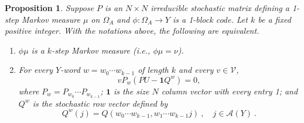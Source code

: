 \documentclass{kepart2010}
\theoremstyle{plain}
\newtheorem{prop}[thm]{Proposition}
\theoremstyle{definition}
\theoremstyle{remark}
\theoremstyle{definition}
\numberwithin{equation}{section}
\begin{document}
{}{
\begin{prop} \label{kmarkov} \cite{GurvitsLedoux2005}
Suppose $P$ is an $N\times N$ irreducible stochastic matrix defining
a 1-step Markov measure $\mu$
on $\Omega_A$ and $\phi: \Omega_A \to Y $ is
a 1-block code. Let $k$ be a fixed positive integer.
With the notations above, the following are equivalent.
\begin{enumerate}
\item
$\phi \mu $ is a $k$-step Markov measure
(i.e., $\phi \mu = \nu$).
\item For every $Y$-word $w=w_0\cdots w_{k-1}$
of length $k$ and
every $v\in \mathcal V$,
 \begin{equation} \label{firstkmarkovcondition}
vP_w(PU-\mathbf 1Q^{w}) =
 0 ,
 \end{equation}
 where $P_w=P_{w_0}\cdots P_{w_{k-1}}$;
$\mathbf 1$ is the size $N$ column vector with every
entry 1;  and
 $Q^{w}$ is the stochastic row vector defined by
 \begin{equation} Q^{w}(j) = Q(w_0\cdots w_{k-1},w_1\cdots w_{k-1}j) \  , \quad
 j\in \mathcal A(Y)\ .
 \end{equation}
\end{enumerate}
\end{prop}
}
\end{document}
